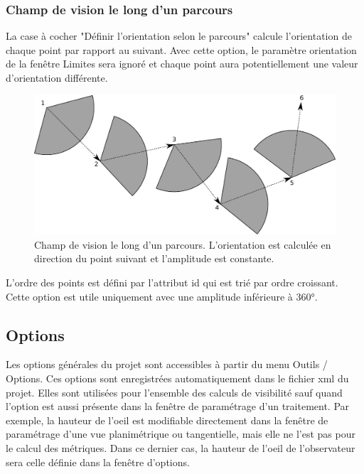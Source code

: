 \documentclass{report}
\begin{document}
\subsubsection{Champ de vision le long d'un parcours}
La case à cocher "Définir l'orientation selon le parcours" calcule l'orientation de chaque point par rapport au suivant. Avec cette option, le paramètre orientation de la fenêtre Limites sera ignoré et chaque point aura potentiellement une valeur d'orientation différente. 

\begin{figure}[H]
	\includegraphics[scale=0.8]{img/path_orien.pdf} 
	\caption{Champ de vision le long d'un parcours. L'orientation est calculée en direction du point suivant et l'amplitude est constante.}
	\label{path_orien}
\end{figure}

L'ordre des points est défini par l'attribut id qui est trié par ordre croissant.
Cette option est utile uniquement avec une amplitude inférieure à 360°.


\subsection{Options}
\label{options}
Les options générales du projet sont accessibles à partir du menu Outils / Options.
Ces options sont enregistrées automatiquement dans le fichier xml du projet. Elles sont utilisées pour l'ensemble des calculs de visibilité sauf quand l'option est aussi présente dans la fenêtre de paramétrage d'un traitement. Par exemple, la hauteur de l'oeil est modifiable directement dans la fenêtre de paramétrage d'une vue planimétrique ou tangentielle, mais elle ne l'est pas pour le calcul des métriques. Dans ce dernier cas, la hauteur de l'oeil de l'observateur sera celle définie dans la fenêtre d'options.
\end{document}
